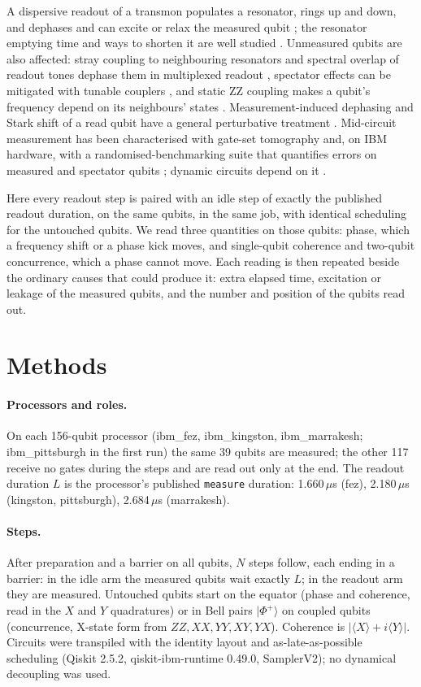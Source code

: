 \documentclass[reprint,amsmath,amssymb,aps,superscriptaddress,nofootinbib]{revtex4-2}
\newcommand{\us}{\,$\mu$s}
\begin{document}
A dispersive readout of a transmon populates a resonator, rings up and down, and dephases and can excite or relax the measured qubit \cite{Gambetta2006,Boissonneault2009,Sank2016}; the resonator emptying time and ways to shorten it are well studied \cite{McClure2016,Bultink2016,Walter2017,Swiadek2024}. Unmeasured qubits are also affected: stray coupling to neighbouring resonators and spectral overlap of readout tones dephase them in multiplexed readout \cite{Heinsoo2018}, spectator effects can be mitigated with tunable couplers \cite{Vallesa2026}, and static ZZ coupling makes a qubit's frequency depend on its neighbours' states \cite{Sundaresan2020,Kandala2021,Ketterer2023,Zhao2021}. Measurement-induced dephasing and Stark shift of a read qubit have a general perturbative treatment \cite{Malekakhlagh2022}. Mid-circuit measurement has been characterised with gate-set tomography \cite{Rudinger2022} and, on IBM hardware, with a randomised-benchmarking suite that quantifies errors on measured and spectator qubits \cite{Govia2023}; dynamic circuits depend on it \cite{Corcoles2021}.

Here every readout step is paired with an idle step of exactly the published readout duration, on the same qubits, in the same job, with identical scheduling for the untouched qubits. We read three quantities on those qubits: phase, which a frequency shift or a phase kick moves, and single-qubit coherence and two-qubit concurrence, which a phase cannot move. Each reading is then repeated beside the ordinary causes that could produce it: extra elapsed time, excitation or leakage of the measured qubits, and the number and position of the qubits read out.

\section{Methods}

\paragraph*{Processors and roles.} On each 156-qubit processor (ibm\_fez, ibm\_kingston, ibm\_marrakesh; ibm\_pittsburgh in the first run) the same 39 qubits are measured; the other 117 receive no gates during the steps and are read out only at the end. The readout duration $L$ is the processor's published \texttt{measure} duration: 1.660\us{} (fez), 2.180\us{} (kingston, pittsburgh), 2.684\us{} (marrakesh).

\paragraph*{Steps.} After preparation and a barrier on all qubits, $N$ steps follow, each ending in a barrier: in the idle arm the measured qubits wait exactly $L$; in the readout arm they are measured. Untouched qubits start on the equator (phase and coherence, read in the $X$ and $Y$ quadratures) or in Bell pairs $|\Phi^+\rangle$ on coupled qubits (concurrence, X-state form from $ZZ,XX,YY,XY,YX$). Coherence is $|\langle X\rangle+i\langle Y\rangle|$. Circuits were transpiled with the identity layout and as-late-as-possible scheduling (Qiskit 2.5.2, qiskit-ibm-runtime 0.49.0, SamplerV2); no dynamical decoupling was used.
\end{document}
